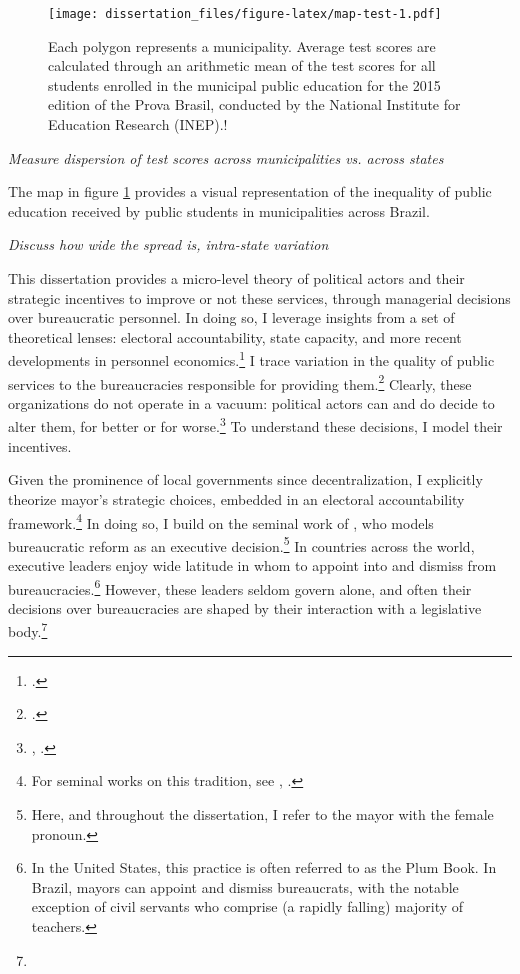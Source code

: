 \documentclass[12pt,]{book}
\let\rmarkdownfootnote\footnote%
\def\footnote{\protect\rmarkdownfootnote}
\begin{document}
\begin{figure}
\centering
\texttt{[image: dissertation\_files/figure-latex/map-test-1.pdf]}
\caption{\label{fig:map-test} Each polygon represents a municipality. Average test scores are calculated through an arithmetic mean of the test scores for all students enrolled in the municipal public education for the 2015 edition of the Prova Brasil, conducted by the National Institute for Education Research (INEP).!}
\end{figure}

\textit{Measure dispersion of test scores across municipalities vs. across states}

The map in figure \ref{fig:map-test} provides a visual representation of the inequality of public education received by public students in municipalities across Brazil.

\emph{Discuss how wide the spread is, intra-state variation}

This dissertation provides a micro-level theory of political actors and their strategic incentives to improve or not these services, through managerial decisions over bureaucratic personnel. In doing so, I leverage insights from a set of theoretical lenses: electoral accountability, state capacity, and more recent developments in personnel economics.\footnote{\citet{finan_personnel_2015}.} I trace variation in the quality of public services to the bureaucracies responsible for providing them.\footnote{\citet{pepinsky_bureaucracy_2017}.} Clearly, these organizations do not operate in a vacuum: political actors can and do decide to alter them, for better or for worse.\footnote{\citet{akhtari_bureaucratic_1997}, \citet{suleiman_dismantling_2013}.} To understand these decisions, I model their incentives.

Given the prominence of local governments since decentralization, I explicitly theorize mayor's strategic choices, embedded in an electoral accountability framework.\footnote{For seminal works on this tradition, see \citet{ferejohn_incumbent_1983}, \citet{barro_control_1973}.} In doing so, I build on the seminal work of \citet{geddes_politicians_199ss4}, who models bureaucratic reform as an executive decision.\footnote{Here, and throughout the dissertation, I refer to the mayor with the female pronoun.} In countries across the world, executive leaders enjoy wide latitude in whom to appoint into and dismiss from bureaucracies.\footnote{In the United States, this practice is often referred to as the Plum Book. In Brazil, mayors can appoint and dismiss bureaucrats, with the notable exception of civil servants who comprise (a rapidly falling) majority of teachers.} However, these leaders seldom govern alone, and often their decisions over bureaucracies are shaped by their interaction with a legislative body.\footnote{}
\end{document}
